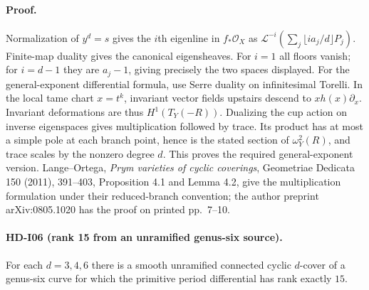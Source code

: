\paragraph{Proof.}
Normalization of $y^d=s$ gives the $i$th eigenline in $f_*\mathcal O_X$
as
$\mathcal L^{-i}(\sum_j\lfloor ia_j/d\rfloor P_j)$.
Finite-map duality gives the canonical eigensheaves. For $i=1$ all
floors vanish; for $i=d-1$ they are $a_j-1$, giving precisely the
two spaces displayed.
For the general-exponent differential formula, use Serre duality on
infinitesimal Torelli. In the local tame chart $x=t^k$, invariant
vector fields upstairs descend to $xh(x)\partial_x$. Invariant
deformations are thus $H^1(T_Y(-R))$. Dualizing the cup action on
inverse eigenspaces gives multiplication followed by trace. Its product
has at most a simple pole at each branch point, hence is the stated
section of $\omega_Y^2(R)$, and trace scales by the nonzero degree
$d$. This proves the required general-exponent version.
Lange--Ortega, \emph{Prym varieties of cyclic coverings}, Geometriae
Dedicata 150 (2011), 391--403, Proposition 4.1 and Lemma 4.2,
give the multiplication formulation under their reduced-branch
convention; the author preprint arXiv:0805.1020 has the proof on
printed pp.~7--10.

\paragraph{HD-I06 (rank 15 from an unramified genus-six source).}
For each $d=3,4,6$ there is a smooth unramified connected cyclic
$d$-cover of a genus-six curve for which the primitive period
differential has rank exactly $15$.

